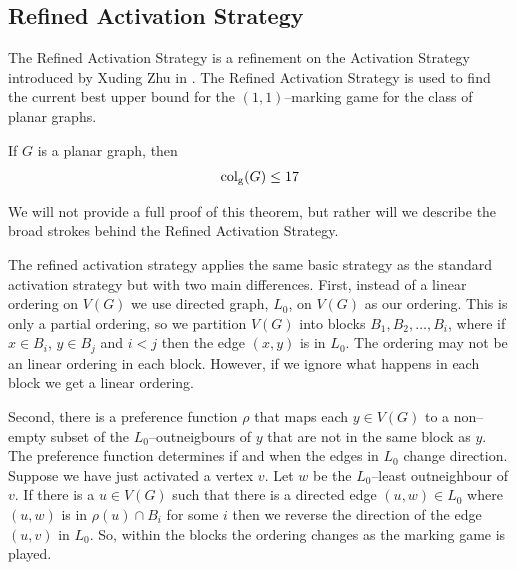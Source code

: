\subsection{Refined Activation Strategy}\label{sec:refActStrat}
The Refined Activation Strategy is a refinement on the Activation Strategy introduced by Xuding Zhu in \cite{Zhu2008}. The Refined Activation Strategy is used to find the current best upper bound for the $(1,1)$--marking game for the class of planar graphs. 

\begin{theorem}
    If $G$ is a planar graph, then \[\operatorname{col_g}(G)\leq17\]
\end{theorem}

We will not provide a full proof of this theorem, but rather will we describe the broad strokes behind the Refined Activation Strategy.

The refined activation strategy applies the same basic strategy as the standard activation strategy but with two main differences. First, instead of a linear ordering on $V(G)$ we use directed graph, $L_0$, on $V(G)$ as our ordering. This is only a partial ordering, so we partition $V(G)$ into blocks $B_1,B_2,\dots,B_i$, where if $x \in B_i$, $y \in B_j$ and $i < j$ then the edge $(x,y)$ is in $L_0$. The ordering may not be an linear ordering in each block. However, if we ignore what happens in each block we get a linear ordering.

Second, there is a preference function $\rho$ that maps each $y \in V(G)$ to a non--empty subset of the $L_0$--outneigbours of $y$ that are not in the same block as $y$. The preference function determines if and when the edges in $L_0$ change direction. Suppose we have just activated a vertex $v$. Let $w$ be the $L_0$--least outneighbour of $v$. If there is a $u\in V(G)$ such that there is a directed edge $(u,w)\in L_0$ where $(u,w)$ is in $\rho(u)\cap B_i$ for some $i$ then we reverse the direction of the edge $(u,v)$ in $L_0$. So, within the blocks the ordering changes as the marking game is played.















